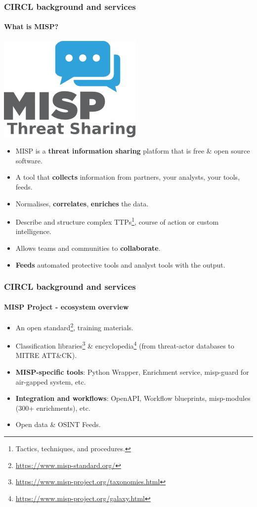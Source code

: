 \begin{frame}
	\frametitle{CIRCL background and services}
	\framesubtitle{What is MISP?}
    \begin{center}
        \includegraphics[width=0.2\linewidth]{pictures/misp-logo.png}
    \end{center}
    \begin{itemize}
        \item MISP is a {\bf threat information sharing} platform that is free \& open source software.
        \item A tool that {\bf collects} information from partners, your analysts, your tools, feeds.
        \item Normalises, {\bf correlates}, {\bf enriches} the data.
        \item Describe and structure complex TTPs\footnote{Tactics, techniques, and procedures.}, course of action or custom intelligence. 
        \item Allows teams and communities to {\bf collaborate}.
        \item {\bf Feeds} automated protective tools and analyst tools with the output.
    \end{itemize}
\end{frame}

\begin{frame}
    \frametitle{CIRCL background and services}
    \framesubtitle{MISP Project - ecosystem overview}

    \begin{itemize}
        \item An open standard\footnote{\url{https://www.misp-standard.org/}}, training materials.
        \item Classification libraries\footnote{\url{https://www.misp-project.org/taxonomies.html}} \& encyclopedia\footnote{\url{https://www.misp-project.org/galaxy.html}} (from threat-actor databases to MITRE ATT\&CK).
        \item \textbf{MISP-specific tools}: Python Wrapper, Enrichment service, misp-guard for air-gapped system, etc.
        \item \textbf{Integration and workflows}: OpenAPI, Workflow blueprints, misp-modules (300+ enrichments), etc.
        \item Open data \& OSINT Feeds.
    \end{itemize}
\end{frame}

